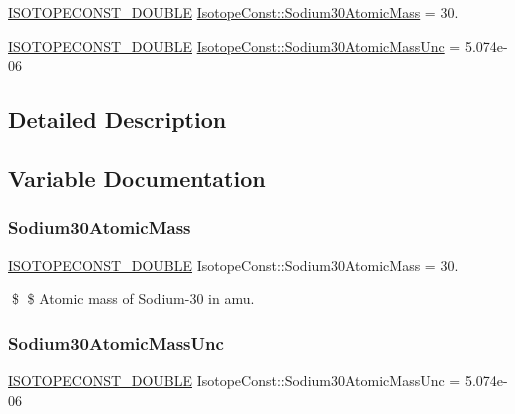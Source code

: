 \begin{DoxyCompactItemize}
\item 
\mbox{\hyperlink{group___isotope_const-_macros_ga8f45a7272ce02c0b4c65c44636ed719a}{I\+S\+O\+T\+O\+P\+E\+C\+O\+N\+S\+T\+\_\+\+D\+O\+U\+B\+LE}} \mbox{\hyperlink{group___isotope_const-_sodium-_na30_gacdfa35a1036f6f39924a9d5efc9458f6}{Isotope\+Const\+::\+Sodium30\+Atomic\+Mass}} = 30.
\item 
\mbox{\hyperlink{group___isotope_const-_macros_ga8f45a7272ce02c0b4c65c44636ed719a}{I\+S\+O\+T\+O\+P\+E\+C\+O\+N\+S\+T\+\_\+\+D\+O\+U\+B\+LE}} \mbox{\hyperlink{group___isotope_const-_sodium-_na30_gabe872795b72f104c2038c79801f5c4b0}{Isotope\+Const\+::\+Sodium30\+Atomic\+Mass\+Unc}} = 5.\+074e-\/06
\end{DoxyCompactItemize}


\subsection{Detailed Description}


\subsection{Variable Documentation}
\mbox{\label{group___isotope_const-_sodium-_na30_gacdfa35a1036f6f39924a9d5efc9458f6}} 
\subsubsection{\texorpdfstring{Sodium30\+Atomic\+Mass}{Sodium30AtomicMass}}
{\footnotesize\ttfamily \mbox{\hyperlink{group___isotope_const-_macros_ga8f45a7272ce02c0b4c65c44636ed719a}{I\+S\+O\+T\+O\+P\+E\+C\+O\+N\+S\+T\+\_\+\+D\+O\+U\+B\+LE}} Isotope\+Const\+::\+Sodium30\+Atomic\+Mass = 30.}

\$ \$ Atomic mass of Sodium-\/30 in amu. \mbox{\label{group___isotope_const-_sodium-_na30_gabe872795b72f104c2038c79801f5c4b0}} 
\subsubsection{\texorpdfstring{Sodium30\+Atomic\+Mass\+Unc}{Sodium30AtomicMassUnc}}
{\footnotesize\ttfamily \mbox{\hyperlink{group___isotope_const-_macros_ga8f45a7272ce02c0b4c65c44636ed719a}{I\+S\+O\+T\+O\+P\+E\+C\+O\+N\+S\+T\+\_\+\+D\+O\+U\+B\+LE}} Isotope\+Const\+::\+Sodium30\+Atomic\+Mass\+Unc = 5.\+074e-\/06}

